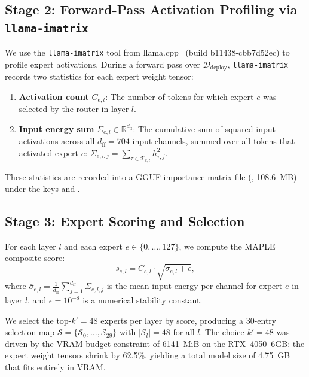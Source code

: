 \documentclass[10pt]{article}
\newcommand{\MAPLE}{\textsc{MAPLE}}
\newcommand{\R}{\mathbb{R}}
\begin{document}
\subsection{Stage 2: Forward-Pass Activation Profiling via \texttt{llama-imatrix}}
We use the \texttt{llama-imatrix} tool from llama.cpp~\cite{llama_cpp} (build b11438-cbb7d52ec) to profile expert activations. During a forward pass over $\mathcal{D}_\text{deploy}$, \texttt{llama-imatrix} records two statistics for each expert weight tensor:
\begin{enumerate}[leftmargin=1.5em,topsep=2pt,itemsep=1pt]
  \item \textbf{Activation count} $C_{e,l}$: The number of tokens for which expert $e$ was selected by the router in layer $l$.
  \item \textbf{Input energy sum} $\Sigma_{e,l} \in \R^{d_\text{ff}}$: The cumulative sum of squared input activations across all $d_\text{ff} = 704$ input channels, summed over all tokens that activated expert $e$: $\Sigma_{e,l,j} = \sum_{\tau \in \mathcal{T}_{e,l}} h_{\tau,j}^2$.
\end{enumerate}

These statistics are recorded into a GGUF importance matrix file (, 108.6~MB) under the keys  and .

\subsection{Stage 3: Expert Scoring and Selection}
For each layer $l$ and each expert $e \in \{0, \ldots, 127\}$, we compute the \MAPLE{} composite score:
\begin{equation}
  s_{e,l} = C_{e,l} \cdot \sqrt{\bar{\sigma}_{e,l} + \epsilon},
  \label{eq:score}
\end{equation}
where $\bar{\sigma}_{e,l} = \frac{1}{d_\text{ff}} \sum_{j=1}^{d_\text{ff}} \Sigma_{e,l,j}$ is the mean input energy per channel for expert $e$ in layer $l$, and $\epsilon = 10^{-8}$ is a numerical stability constant.

We select the top-$k'=48$ experts per layer by score, producing a 30-entry selection map $\mathcal{S} = \{\mathcal{S}_0, \ldots, \mathcal{S}_{29}\}$ with $|\mathcal{S}_l| = 48$ for all $l$. The choice $k'=48$ was driven by the VRAM budget constraint of 6141~MiB on the RTX~4050~6GB: the expert weight tensors shrink by 62.5\%, yielding a total model size of 4.75~GB that fits entirely in VRAM.
\end{document}
